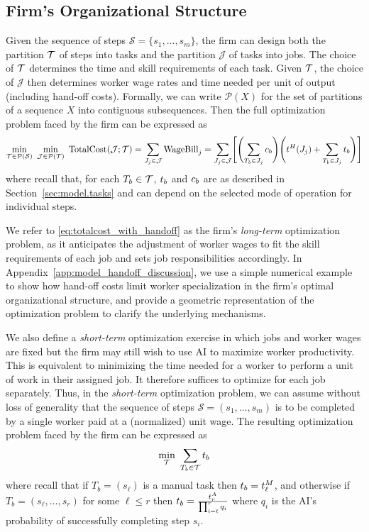 \subsection{Firm's Organizational Structure}

Given the sequence of steps $\mathcal{S} = \{s_1, \dotsc, s_m\}$, the firm can design both the partition $\mathcal{T}$ of steps into tasks and the partition $\mathcal{J}$ of tasks into jobs.
The choice of $\mathcal{T}$ determines the time and skill requirements of each task.
Given $\mathcal{T}$, the choice of $\mathcal{J}$ then determines worker wage rates and time needed per unit of output (including hand-off costs).
Formally, we can write $\mathcal{P}(X)$ for the set of partitions of a sequence $X$ into contiguous subsequences.  Then the full optimization problem faced by the firm can be expressed as
\begin{align}
\label{eq:totalcost_with_handoff}
\min_{\T \in \mathcal{P}(\mathcal{S})} \
\min_{\mathcal{J} \in \mathcal{P}(\T)} \ 
\text{TotalCost}(\mathcal{J}; \T) 
= \sum_{J_j \in \mathcal{J}} \text{WageBill}_j = 
\sum_{J_j \in \mathcal{J}} \Biggl[\Biggl(\sum_{T_b \in J_j} \skillcost{b} \Biggr) \Biggl(\handofftime{}(J_j) + \sum_{T_b \in J_j} \timecost{b} \Biggr)\Biggr]
\end{align}
where recall that, for each $T_b \in \mathcal{T}$, $t_{b}$ and $c_{b}$ are as described in Section~\ref{sec:model.tasks} and can depend on the selected mode of operation for individual steps.

We refer to \eqref{eq:totalcost_with_handoff} as the firm's \emph{long-term} optimization problem, as it anticipates the adjustment of worker wages to fit the skill requirements of each job and sets job responsibilities accordingly.
In Appendix~\ref{app:model_handoff_discussion}, we use a simple numerical example to show how hand-off costs limit worker specialization in the firm's optimal organizational structure, and provide a geometric representation of the optimization problem to clarify the underlying mechanisms.  

We also define a \emph{short-term} optimization exercise in which jobs and worker wages are fixed but the firm may still wish to use AI to maximize worker productivity.
This is equivalent to minimizing the time needed for a worker to perform a unit of work in their assigned job.
It therefore suffices to optimize for each job separately.
Thus, in the \emph{short-term} optimization problem, we can assume without loss of generality that the sequence of steps $\mathcal{S} = (s_1, \dotsc, s_m)$ is to be completed by a single worker paid at a (normalized) unit wage.
The resulting optimization problem faced by the firm can be expressed as
\begin{align}
\label{eq:totalcost_shortterm}
\min_{\mathcal{T}} \
\sum_{T_b \in \mathcal{T}} t_{b}
\end{align}
where recall that if $T_b = (s_\ell)$ is a manual task then $t_{b} = t^{M}_{\ell}$, and otherwise if $T_b = (s_\ell, \dotsc, s_r)$ for some $\ell \leq r$ then $t_{b} = \frac{t^{A}_{r}}{\prod_{i=\ell}^{r} q_i}$ where $q_i$ is the AI's probability of successfully completing step $s_i$.